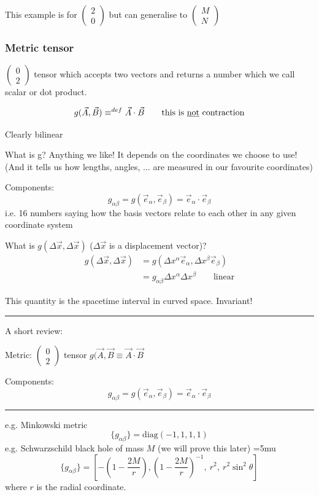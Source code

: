 \documentclass[a4paper]{article} %
\newcommand{\review}[1]
{
\hrule
A short review:

#1
\hrule
}
\newcommand{\pmx}[1]{
\begin{pmatrix}
#1
\end{pmatrix}
}
\begin{document}
This example is for $\pmx{2\\0}$ but can generalise to $\pmx{M\\N}$

\subsubsection{Metric tensor}
$\pmx{0\\2}$ tensor which accepts two vectors and returns a number which we call scalar or dot product.

\begin{equation}
g(\vec{A},\vec{B})\equiv^{def}\vec{A}\cdot \vec{B}\qquad\text{this is \underline{not} contraction}
\end{equation}

Clearly bilinear

What is g? Anything we like! It depends on the coordinates we choose to use! (And it tells us how lengths, angles, $\ldots$ are measured in our favourite coordinates)

Components: 
\begin{equation}
g_{\alpha\beta}=g(\vec{e}_{\alpha},\vec{e}_{\beta})=\vec{e}_{\alpha}\cdot \vec{e}_{\beta}
\end{equation}
i.e. 16 numbers saying how the basis vectors relate to each other in any given coordinate system

What is $g(\Delta\vec{x},\Delta\vec{x})$ ($\Delta\vec{x}$ is a displacement vector)?
\begin{align*}
g(\Delta\vec{x},\Delta\vec{x})&=g(\Delta x^{\alpha}\vec{e}_{\alpha},\Delta x^{\beta}\vec{e}_{\beta})\\
&=g_{\alpha\beta}\Delta x^{\alpha}\Delta x^{\beta} \qquad\text{linear}
\end{align*}

This quantity is the spacetime interval in curved space. Invariant!

\review{Metric: $\pmx{0\\2}$ tensor $g(\vec{A},\vec{B}\equiv \vec{A}\cdot\vec{B}$

Components: 
\begin{equation}
g_{\alpha\beta}=g(\vec{e}_{\alpha},\vec{e}_{\beta})=\vec{e}_{\alpha}\cdot \vec{e}_{\beta}
\end{equation}
}

e.g. Minkowski metric
\begin{equation}
\{g_{\alpha\beta}\}=\text{diag}(-1,1,1,1)
\end{equation}
e.g. Schwarzschild black hole of mass $M$ (we will prove this later)
\thinmuskip=5mu
\begin{equation}
\{g_{\alpha\beta}\}=\left[-\left(1-\frac{2M}{r}\right),\left(1-\frac{2M}{r}\right)^{-1},~r^2,~r^2\sin^2\theta\right]
\end{equation}
where $r$ is the radial coordinate.
\end{document}
